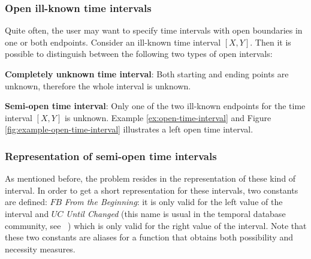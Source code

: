 \subsubsection{\label{subsubsec:open-interval}Open ill-known time intervals}
Quite often, the user may want to specify time intervals with open boundaries in one or both endpoints. Consider an ill-known time interval $\left[X, Y\right]$. Then it is possible to distinguish between the following two types of open intervals:
\begin{definition}
\textbf{Completely unknown time interval}: Both starting and ending points are unknown, therefore the whole interval is unknown.
\end{definition}

\begin{definition}
\textbf{Semi-open time interval}: Only one of the two ill-known endpoints for the time interval $\left[X, Y\right]$ is unknown. Example \ref{ex:open-time-interval} and Figure \ref{fig:example-open-time-interval} illustrates a left open time interval.
\end{definition}

\subsubsection{\label{subsubsec:representation-semi-open}Representation of semi-open time intervals}
As mentioned before, the problem resides in the representation of these kind of interval. In order to get a short representation for these intervals, two constants are defined: $FB$ \emph{From the Beginning}: it is only valid for the left value of the interval and $UC$ \emph{Until Changed} (this name is usual in the temporal database community, see ~\cite{Jensen1994}) which is only valid for the right value of the interval. Note that these two constants are aliases for a function that obtains both possibility and necessity measures. 

